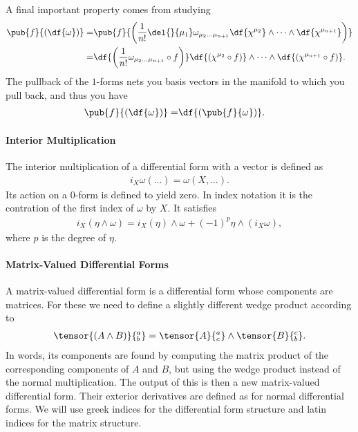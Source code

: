 A final important property comes from studying
\begin{align*}
	\pub{f}{(\df{\omega})} =& \pub{f}{\left(\frac{1}{n!}\del{}{\mu_{1}}\omega_{\mu_{2}\dots\mu_{n + 1}}\df{\chi^{\mu_{2}}}\wedge\dots\wedge\df{\chi^{\mu_{n + 1}}}\right)} \\
	=& \df{\left(\frac{1}{n!}\omega_{\mu_{2}\dots\mu_{n + 1}}\circ f\right)}\df{(\chi^{\mu_{2}}\circ f)}\wedge\dots\wedge\df{(\chi^{\mu_{n  +1}}\circ f)}.
\end{align*}
The pullback of the $1$-forms nets you basis vectors in the manifold to which you pull back, and thus you have
\begin{align*}
	\pub{f}{(\df{\omega})} =& \df{(\pub{f}{\omega})}.
\end{align*}

\paragraph{Interior Multiplication}
The interior multiplication of a differential form with a vector is defined as
\begin{align*}
	i_{X}\omega(\dots) = \omega(X, \dots).
\end{align*}
Its action on a 0-form is defined to yield zero. In index notation it is the contration of the first index of $\omega$ by $X$. It satisfies
\begin{align*}
	i_{X}(\eta\wedge\omega) = i_{X}(\eta)\wedge\omega + (-1)^{p}\eta\wedge(i_{X}\omega),
\end{align*}
where $p$ is the degree of $\eta$.

\paragraph{Matrix-Valued Differential Forms}
A matrix-valued differential form is a differential form whose components are matrices. For these we need to define a slightly different wedge product according to
\begin{align*}
	\tensor{(A\wedge B)}{^{a}_{b}} = \tensor{A}{^{a}_{c}}\wedge\tensor{B}{^{c}_{b}}.
\end{align*}
In words, its components are found by computing the matrix product of the corresponding components of $A$ and $B$, but using the wedge product instead of the normal multiplication. The output of this is then a new matrix-valued differential form. Their exterior derivatives are defined as for normal differential forms. We will use greek indices for the differential form structure and latin indices for the matrix structure.

